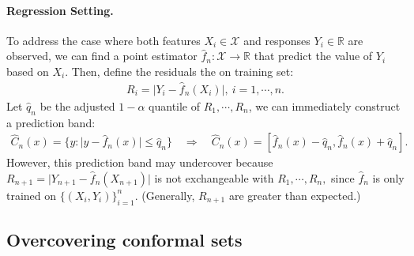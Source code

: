 \documentclass{article}
\numberwithin{equation}{section}
\begin{document}
\paragraph{Regression Setting.} To address the case where both features $X_i\in\mathcal{X}$ and responses $Y_i\in\mathbb{R}$ are observed, we can find a point estimator $\widehat{f}_n:\mathcal{X}\to\mathbb{R}$ that predict the value of $Y_{i}$ based on $X_i.$ Then, define the residuals the on training set:
\begin{align*}
	R_i = \vert Y_i - \widehat{f}_n(X_i)\vert,\ i=1,\cdots,n.\tag{2.1}
\end{align*}
Let $\widehat{q}_n$ be the adjusted $1-\alpha$ quantile of $R_1,\cdots,R_n$, we can immediately construct a prediction band:
\begin{align*}
	\widehat{C}_n(x) = \{y:\vert y-\widehat{f}_n(x)\vert\leq\widehat{q}_n\}\quad\Rightarrow\quad\widehat{C}_n(x)=\left[\widehat{f}_n(x)-\widehat{q}_n,\widehat{f}_n(x)+\widehat{q}_n\right].\tag{2.2}
\end{align*}
However, this prediction band may undercover because $R_{n+1}=\vert Y_{n+1}-\widehat{f}_n(X_{n+1})\vert$ is not exchangeable with $R_1,\cdots,R_n,$ since $\widehat{f}_n$ is only trained on $\{(X_i,Y_i)\}_{i=1}^n.$ (Generally, $R_{n+1}$ are greater than expected.)

\subsection{Overcovering conformal sets}
\end{document}
